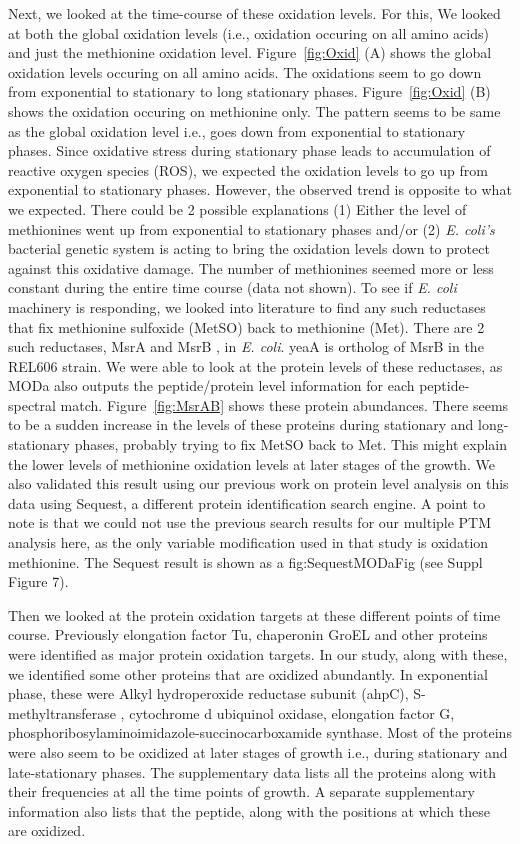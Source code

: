 \documentclass[12pt]{article}
\begin{document}
Next, we looked at the time-course of these oxidation levels. For this, We looked at both the global oxidation levels (i.e., oxidation occuring on all amino acids) and just the methionine oxidation level. Figure~\ref{fig:Oxid} (A) shows the global oxidation levels occuring on all amino acids. The oxidations seem to go down from exponential to stationary to long stationary phases. Figure~\ref{fig:Oxid} (B) shows the oxidation occuring on methionine only. The pattern seems to be same as the global oxidation level i.e., goes down from exponential to stationary phases. Since oxidative stress during stationary phase leads to accumulation of reactive oxygen species (ROS), we expected the oxidation levels to go up from exponential to stationary phases. However, the observed trend is opposite to what we expected. There could be 2 possible explanations (1) Either the level of methionines went up from exponential to stationary phases and/or (2) \emph{E. coli's} bacterial genetic system is acting to bring the oxidation levels down to protect against this oxidative damage. The number of methionines seemed more or less constant during the entire time course (data not shown). To see if \emph{E. coli} machinery is responding, we looked into literature to find any such reductases that fix methionine sulfoxide (MetSO) back to methionine (Met).  There are 2 such reductases, MsrA \cite{Abramsetal1981} and MsrB \cite{Grimaudetal2001}, in \emph{E. coli}. yeaA is ortholog of MsrB in the REL606 strain. We were able to look at the protein levels of these reductases, as MODa also outputs the peptide/protein level information for each peptide-spectral match. Figure~\ref{fig:MsrAB} shows these protein abundances. There seems to be a sudden increase in the levels of these proteins during stationary and long-stationary phases, probably trying to fix MetSO back to Met. This might explain the lower levels of methionine oxidation levels at later stages of the growth. We also validated this result using our previous work \cite{Houseretal2015} on protein level analysis on this data using Sequest, a different protein identification search engine. A point to note is that we could not use the previous search results for our multiple PTM analysis here, as the only variable modification used in that study is oxidation methionine. The Sequest result is shown as a fig:SequestMODaFig (see Suppl Figure 7).

Then we looked at the protein oxidation targets at these different points of time course. Previously elongation factor Tu, chaperonin GroEL and other proteins were identified as major protein oxidation targets. In our study, along with these, we identified some other proteins that are oxidized abundantly. In exponential phase, these were Alkyl hydroperoxide reductase subunit (ahpC), S-methyltransferase , cytochrome d ubiquinol oxidase, elongation factor G, phosphoribosylaminoimidazole-succinocarboxamide synthase. Most of the proteins were also seem to be oxidized at later stages of growth i.e., during stationary and late-stationary phases. The supplementary data lists all the proteins along with their frequencies at all the time points of growth. A separate supplementary information also lists that the peptide, along with the positions at which these are oxidized.
\end{document}
